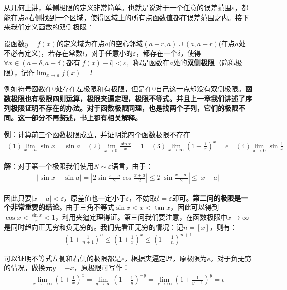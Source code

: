 \documentclass{ctexart}
\let\oldtextbf\textbf %
\renewcommand{\textbf}[1]{\textcolor{btex}{\oldtextbf{#1}}} %
\begin{document}
从几何上讲，单侧极限的定义非常简单。也就是说对于一个任意的误差范围$\varepsilon$，都能在点$a$右侧找到一个区域，使得区域上的所有点函数值都在误差范围之内。接下来我们定义函数的双侧极限：
\begin{tcolorbox}[
    colback=bac2,     %
    colframe=fra2,   %
    coltitle=white,             %
    coltext=tex2,
    title=函数双侧极限,
    fonttitle=\bfseries,        %
arc=3mm,                     %
breakable
]
设函数$y=f(x)$的定义域为在点$a$的空心邻域$(a-r,a)\cup (a,a+r)$(在点$a$处不必有定义)，若存在常数$l$，对于任意小的$\varepsilon$，都存在一个$\delta$，使得$\forall x\in (a-\delta,a+\delta)$都有$|f(x)-l|<\varepsilon$，称$l$是函数在$a$处的\textbf{\color{btex}双侧极限}（简称极限），记作$\lim_{x\to a}f(x)=l$
\end{tcolorbox}

例如符号函数在$0$处存在左极限和有极限，但是在$0$自己这一点却没有双侧极限。\textbf{\color{btex}函数极限也有极限四则运算，极限夹逼定理，极限不等式。并且上一章我们讲述了序列极限证明不存在的办法。对于函数极限同理，也是找两个子列，它们的极限不同。这一部分不再赘述，书上都有相关解释。}

\textbf{\color{btex}例}：计算前三个函数极限成立，并证明第四个函数极限不存在
\begin{align*}
(1) \lim_{x\to a}\sin x=\sin a\quad (2)\lim_{x\to 0}\frac{\sin x}{x}=1\quad (3)\lim_{x\to \infty}(1+\frac{1}{x})^x=e  \quad (4)\lim_{x\to 0}\sin\frac{1}{x}
\end{align*}

\textbf{\color{btex}解}：对于第一个极限我们使用$N\sim\varepsilon$语言，由于：
\begin{align*}
    |\sin x-\sin a|=|2\sin \frac{x-a}{2}\cos\frac{x+a}{2}|\leq 2|\sin \frac{x-a|}{2}|\leq|x-a|
\end{align*}

因此只要$|x-a|<\varepsilon$，原差值也一定小于$\varepsilon$，不妨取$\delta=\varepsilon$即可。\textbf{\color{btex}第二问的极限是一个非常重要的结论}。由于三角不等式$\sin x<x<\tan x$，因此可以得到$\cos x<\frac{\sin x}{x}<1$，利用夹逼定理得证。第三问我们要注意，在函数极限中$x\to\infty$是同时趋向正无穷和负无穷的。我们先看正无穷的情况：记$n=[x]$，则有：
\begin{align*}
    (1+\frac{1}{n+1})^n\leq (1+\frac{1}{x})^x\leq (1+\frac{1}{n})^{n+1}
\end{align*}

可以证明不等式左侧和右侧的极限都是$e$，根据夹逼定理，原极限为$e$。对于负无穷的情况，做换元$y=-x$，原极限可写作：
\begin{align*}
    \lim_{x\to -\infty}(1+\frac{1}{x})^x=\lim_{y\to \infty}(1-\frac{1}{y})^{-y}=\lim_{y\to \infty}(1+\frac{1}{y-1})^{y}=e
\end{align*}
\end{document}
